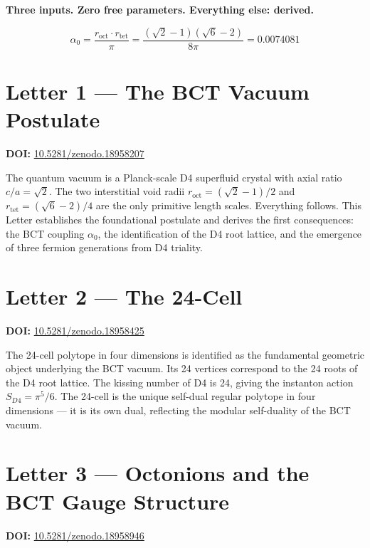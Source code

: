 \documentclass[aps,prl,twocolumn,showpacs,preprintnumbers]{revtex4-2}
\newcommand{\roct}{r_{\mathrm{oct}}}
\newcommand{\rtet}{r_{\mathrm{tet}}}
\newcommand{\azero}{\alpha_0}
\begin{document}
\medskip
\noindent\textbf{Three inputs. Zero free parameters. Everything else: derived.}

\begin{equation}
\alpha_0 = \frac{\roct \cdot \rtet}{\pi}
= \frac{(\sqrt{2}-1)(\sqrt{6}-2)}{8\pi}
= 0.0074081
\end{equation}

\section{Letter 1 --- The BCT Vacuum Postulate}
\noindent\textbf{DOI:} \href{https://doi.org/10.5281/zenodo.18958207}{10.5281/zenodo.18958207}

\medskip
The quantum vacuum is a Planck-scale D4 superfluid crystal with
axial ratio $c/a = \sqrt{2}$. The two interstitial void radii
$\roct = (\sqrt{2}-1)/2$ and $\rtet = (\sqrt{6}-2)/4$ are the
only primitive length scales. Everything follows. This Letter
establishes the foundational postulate and derives the first
consequences: the BCT coupling $\azero$, the identification of
the D4 root lattice, and the emergence of three fermion generations
from D4 triality.

\section{Letter 2 --- The 24-Cell}
\noindent\textbf{DOI:} \href{https://doi.org/10.5281/zenodo.18958425}{10.5281/zenodo.18958425}

\medskip
The 24-cell polytope in four dimensions is identified as the
fundamental geometric object underlying the BCT vacuum. Its
24 vertices correspond to the 24 roots of the D4 root lattice.
The kissing number of D4 is 24, giving the instanton action
$S_{D4} = \pi^5/6$. The 24-cell is the unique self-dual regular
polytope in four dimensions --- it is its own dual, reflecting
the modular self-duality of the BCT vacuum.

\section{Letter 3 --- Octonions and the BCT Gauge Structure}
\noindent\textbf{DOI:} \href{https://doi.org/10.5281/zenodo.18958946}{10.5281/zenodo.18958946}
\end{document}
